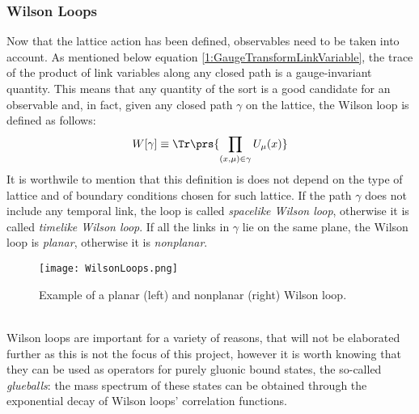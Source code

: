 \subsubsection{Wilson Loops}
Now that the lattice action has been defined, observables need to be taken into account.
As mentioned below equation \eqref{1:GaugeTransformLinkVariable}, the trace of the product of link variables along any closed path is a gauge-invariant quantity.
This means that any quantity of the sort is a good candidate for an observable and, in fact, given any closed path $\gamma$ on the lattice, the Wilson loop is defined as follows:
\begin{equation}
    W[\gamma] \equiv \Tr\prs{\prod_{(x,\mu)\in\gamma}U_\mu(x)} \label{1:WilsonLoop}
\end{equation}
It is worthwile to mention that this definition is does not depend on the type of lattice and of boundary conditions chosen for such lattice.
If the path $\gamma$ does not include any temporal link, the loop is called \emph{spacelike Wilson loop}, otherwise it is called \emph{timelike Wilson loop}.
If all the links in $\gamma$ lie on the same plane, the Wilson loop is \emph{planar}, otherwise it is \emph{nonplanar}.
\begin{figure}[!htbp]
    \centering
    \texttt{[image: WilsonLoops.png]}
    \caption{Example of a planar (left) and nonplanar (right) Wilson loop.}
\end{figure}\\
Wilson loops are important for a variety of reasons, that will not be elaborated further as this is not the focus of this project, however it is worth knowing that they can be used as operators for purely gluonic bound states, the so-called \emph{glueballs}: the mass spectrum of these states can be obtained through the exponential decay of Wilson loops' correlation functions.

